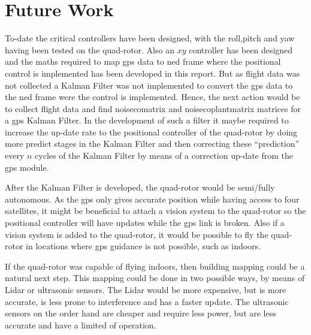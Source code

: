 \chapter{Future Work}

To-date the critical controllers have been designed, with the roll,pitch and yaw  having been tested on the quad-rotor. Also an $xy$ controller has been designed and the maths required to map \gls{gps} data to \gls{ned} frame where the positional control is implemented has been developed in this report. But as flight data was not collected a Kalman Filter was not implemented to convert the \gls{gps} data to the \gls{ned} frame were the control is implemented. Hence, the next action would be to collect flight data and find \gls{noisecomatrix} and \gls{noisecoplantmatrix} matrices for a \gls{gps} Kalman Filter. In the development of such a filter it maybe required to increase the up-date rate to the positional controller of the quad-rotor by doing more predict stages in the Kalman Filter and then correcting these \enquote{prediction} every $n$ cycles of the Kalman Filter by means of a correction up-date from the \gls{gps} module.  

After the Kalman Filter is developed, the quad-rotor would be semi/fully autonomous. As the \gls{gps} only gives accurate position while having access to four satellites, it might be beneficial to attach a vision system to the quad-rotor so the positional controller will have updates while the \gls{gps} link is broken. Also if a vision system is added to the quad-rotor, it would be possible to fly the quad-rotor in locations where \gls{gps} guidance is not possible, such as indoors.  

If the quad-rotor was capable of flying indoors, then building mapping could be a natural next step. This mapping could be done in two possible ways, by means of Lidar or ultrasonic sensors. The Lidar would be more expensive, but is more accurate, is less prone to interference and has a faster update. The ultrasonic sensors on the order hand are cheaper and require less power, but are less accurate and have a limited of operation.

  





